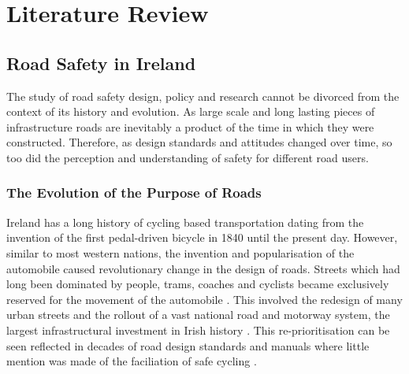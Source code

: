 \chapter{Literature Review}


\section{Road Safety in Ireland}
The study of road safety design, policy and research cannot be divorced from the context of its history and evolution. As large scale and long lasting pieces of infrastructure roads are inevitably a product of the time in which they were constructed. Therefore, as design standards and attitudes changed over time, so too did the perception and understanding of safety for different road users.

\subsection{The Evolution of the Purpose of Roads}
Ireland has a long history of cycling based transportation dating from the invention of the first pedal-driven bicycle in 1840 until the present day. However, similar to most western nations, the invention and popularisation of the automobile caused revolutionary change in the design of roads. Streets which had long been dominated by people, trams, coaches and cyclists became exclusively reserved for the movement of the automobile \citep{southworthStreetsShapingTowns2013}. This involved the redesign of many urban streets and the rollout of a vast national road and motorway system, the largest infrastructural investment in Irish history \citep{obrienDrivingForce102019}. This re-prioritisation can be seen reflected in decades of road design standards and manuals  where little mention was made of the faciliation of safe cycling \citep{dotDesignManualUrban2013}.

